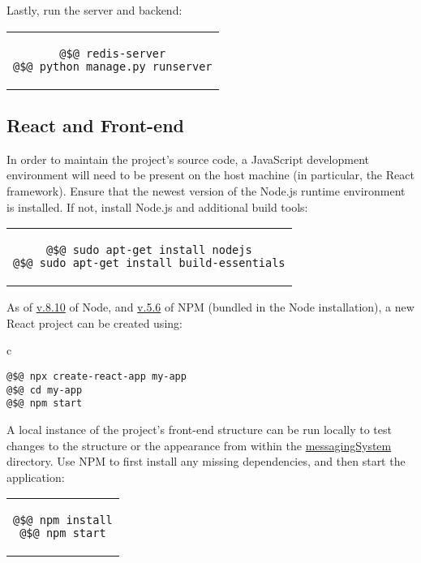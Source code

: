 \documentclass[11pt]{article}
\begin{document}
Lastly, run the server and backend:
\begin{center} \begin{tabular}{c} \begin{lstlisting}[linewidth=5.2cm]
@$@ redis-server
@$@ python manage.py runserver
\end{lstlisting} \end{tabular} \end{center}

\subsection{React and Front-end}
\noindent In order to maintain the project's source code, a JavaScript development environment will
need to be present on the host machine (in particular, the React framework). Ensure that the
newest version of the Node.js runtime environment is installed. If not, install Node.js and additional
build tools:
\begin{center} \begin{tabular}{c} \begin{lstlisting}[linewidth=7.5cm]
@$@ sudo apt-get install nodejs
@$@ sudo apt-get install build-essentials
\end{lstlisting} \end{tabular} \end{center}
As of \url{v.8.10} of Node, and \url{v.5.6} of NPM (bundled in the Node installation), a new React
project can be created using:
\begin{center} \begin{tabular}{c} \begin{lstlisting}[linewidth=5.5cm]
@$@ npx create-react-app my-app
@$@ cd my-app
@$@ npm start
\end{lstlisting} \end{tabular} \end{center}
A local instance of the project's front-end structure can be run locally to test changes to the
structure or the appearance from within the \url{messagingSystem} directory. Use NPM to first
install any missing dependencies, and then start the application:
\begin{center} \begin{tabular}{c} \begin{lstlisting}[linewidth=2.5cm]
@$@ npm install
@$@ npm start
\end{lstlisting} \end{tabular} \end{center}
\end{document}
